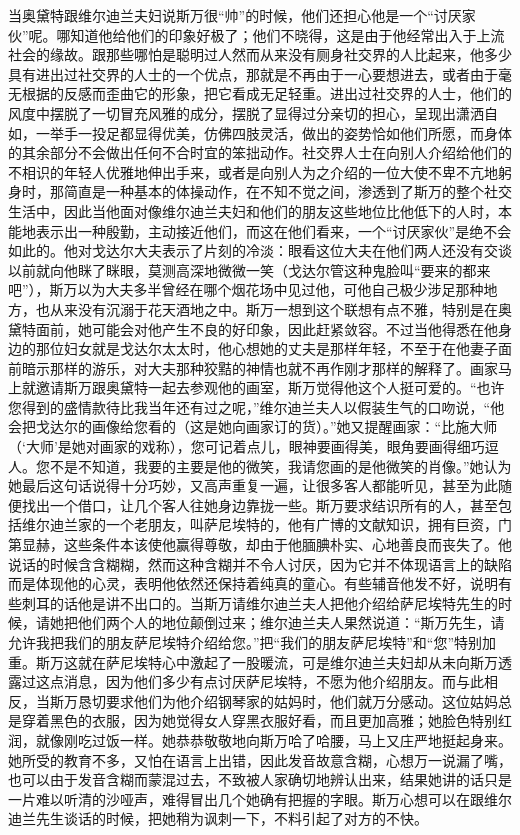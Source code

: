 \par 当奥黛特跟维尔迪兰夫妇说斯万很“帅”的时候，他们还担心他是一个“讨厌家伙”呢。哪知道他给他们的印象好极了；他们不晓得，这是由于他经常出入于上流社会的缘故。跟那些哪怕是聪明过人然而从来没有厕身社交界的人比起来，他多少具有进出过社交界的人士的一个优点，那就是不再由于一心要想进去，或者由于毫无根据的反感而歪曲它的形象，把它看成无足轻重。进出过社交界的人士，他们的风度中摆脱了一切冒充风雅的成分，摆脱了显得过分亲切的担心，呈现出潇洒自如，一举手一投足都显得优美，仿佛四肢灵活，做出的姿势恰如他们所愿，而身体的其余部分不会做出任何不合时宜的笨拙动作。社交界人士在向别人介绍给他们的不相识的年轻人优雅地伸出手来，或者是向别人为之介绍的一位大使不卑不亢地躬身时，那简直是一种基本的体操动作，在不知不觉之间，渗透到了斯万的整个社交生活中，因此当他面对像维尔迪兰夫妇和他们的朋友这些地位比他低下的人时，本能地表示出一种殷勤，主动接近他们，而这在他们看来，一个“讨厌家伙”是绝不会如此的。他对戈达尔大夫表示了片刻的冷淡：眼看这位大夫在他们两人还没有交谈以前就向他眯了眯眼，莫测高深地微微一笑（戈达尔管这种鬼脸叫“要来的都来吧”），斯万以为大夫多半曾经在哪个烟花场中见过他，可他自己极少涉足那种地方，也从来没有沉溺于花天酒地之中。斯万一想到这个联想有点不雅，特别是在奥黛特面前，她可能会对他产生不良的好印象，因此赶紧敛容。不过当他得悉在他身边的那位妇女就是戈达尔太太时，他心想她的丈夫是那样年轻，不至于在他妻子面前暗示那样的游乐，对大夫那种狡黠的神情也就不再作刚才那样的解释了。画家马上就邀请斯万跟奥黛特一起去参观他的画室，斯万觉得他这个人挺可爱的。“也许您得到的盛情款待比我当年还有过之呢，”维尔迪兰夫人以假装生气的口吻说，“他会把戈达尔的画像给您看的（这是她向画家订的货）。”她又提醒画家：“比施大师（‘大师’是她对画家的戏称），您可记着点儿，眼神要画得美，眼角要画得细巧逗人。您不是不知道，我要的主要是他的微笑，我请您画的是他微笑的肖像。”她认为她最后这句话说得十分巧妙，又高声重复一遍，让很多客人都能听见，甚至为此随便找出一个借口，让几个客人往她身边靠拢一些。斯万要求结识所有的人，甚至包括维尔迪兰家的一个老朋友，叫萨尼埃特的，他有广博的文献知识，拥有巨资，门第显赫，这些条件本该使他赢得尊敬，却由于他腼腆朴实、心地善良而丧失了。他说话的时候含含糊糊，然而这种含糊并不令人讨厌，因为它并不体现语言上的缺陷而是体现他的心灵，表明他依然还保持着纯真的童心。有些辅音他发不好，说明有些刺耳的话他是讲不出口的。当斯万请维尔迪兰夫人把他介绍给萨尼埃特先生的时候，请她把他们两个人的地位颠倒过来；维尔迪兰夫人果然说道：“斯万先生，请允许我把我们的朋友萨尼埃特介绍给您。”把“我们的朋友萨尼埃特”和“您”特别加重。斯万这就在萨尼埃特心中激起了一股暖流，可是维尔迪兰夫妇却从未向斯万透露过这点消息，因为他们多少有点讨厌萨尼埃特，不愿为他介绍朋友。而与此相反，当斯万恳切要求他们为他介绍钢琴家的姑妈时，他们就万分感动。这位姑妈总是穿着黑色的衣服，因为她觉得女人穿黑衣服好看，而且更加高雅；她脸色特别红润，就像刚吃过饭一样。她恭恭敬敬地向斯万哈了哈腰，马上又庄严地挺起身来。她所受的教育不多，又怕在语言上出错，因此发音故意含糊，心想万一说漏了嘴，也可以由于发音含糊而蒙混过去，不致被人家确切地辨认出来，结果她讲的话只是一片难以听清的沙哑声，难得冒出几个她确有把握的字眼。斯万心想可以在跟维尔迪兰先生谈话的时候，把她稍为讽刺一下，不料引起了对方的不快。
